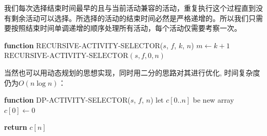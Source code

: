 \documentclass[./../main.tex]{subfiles}
\begin{document}
我们每次选择结束时间最早的且与当前活动兼容的活动，重复执行这个过程直到没有剩余活动可以选择。所选择的活动的结束时间必然是严格递增的。所以我们只需要按照结束时间单调递增的顺序处理所有活动，每个活动仅需要考察一次。

\begin{algorithm}[H]
    \SetAlgoLined
    \DontPrintSemicolon
    
    
    \BlankLine
    \textbf{function} RECURSIVE-ACTIVITY-SELECTOR($s$, $f$, $k$, $n$) \;
    $m \leftarrow k + 1$ \;
    \Else{
        \Return $\emptyset$
    }
    \BlankLine
    $\text{RECURSIVE-ACTIVITY-SELECTOR}(s, f, 0, n)$
    \caption{递归式活动选择算法}
\end{algorithm}

当然也可以用动态规划的思想实现，同时用二分的思路对其进行优化, 时间复杂度仍为$O(n\log n)$：

\begin{algorithm}[t]
    \SetAlgoLined
    \DontPrintSemicolon
    
    
    \BlankLine
    \textbf{function} DP-ACTIVITY-SELECTOR($s$, $f$, $n$) \;
    let $c[0..n]$ be new array \;
    $c[0] \leftarrow 0$ \;
    
    
    \textbf{return} $c[n]$ \;
    \caption{动态规划活动选择算法}
\end{algorithm}
\end{document}
